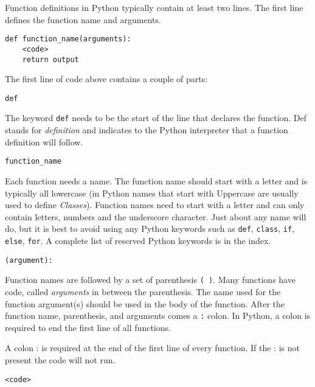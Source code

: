 \documentclass{book}
\newcommand{\passthrough}[1]{#1}
\begin{document}
    
        Function definitions in Python typically contain at least two lines. The
first line defines the function name and arguments.

\begin{lstlisting}
def function_name(arguments):
    <code>
    return output
\end{lstlisting}

The first line of code above contains a couple of parts:

\begin{lstlisting}
def
\end{lstlisting}

The keyword \passthrough{\lstinline!def!} needs to be the start of the
line that declares the function. Def stands for \emph{definition} and
indicates to the Python interpreter that a function definition will
follow.

\begin{lstlisting}
function_name
\end{lstlisting}

Each function needs a name. The function name should start with a letter
and is typically all lowercase (in Python names that start with
Uppercase are usually used to define \emph{Classes}). Function names
need to start with a letter and can only contain letters, numbers and
the underscore character. Just about any name will do, but it is best to
avoid using any Python keywords such as \passthrough{\lstinline!def!},
\passthrough{\lstinline!class!}, \passthrough{\lstinline!if!},
\passthrough{\lstinline!else!}, \passthrough{\lstinline!for!}. A
complete list of reserved Python keywords is in the index.

\begin{lstlisting}
(argument):
\end{lstlisting}

Function names are followed by a set of parenthesis
\passthrough{\lstinline!( )!}. Many functions have code, called
\emph{arguments} in between the parenthesis. The name used for the
function argument(s) should be used in the body of the function. After
the function name, parenthesis, and arguments comes a
\passthrough{\lstinline!:!} colon. In Python, a colon is required to end
the first line of all functions.

A colon : is required at the end of the first line of every function. If
the : is not present the code will not run.

\begin{lstlisting}
<code>
\end{lstlisting}
\end{document}
